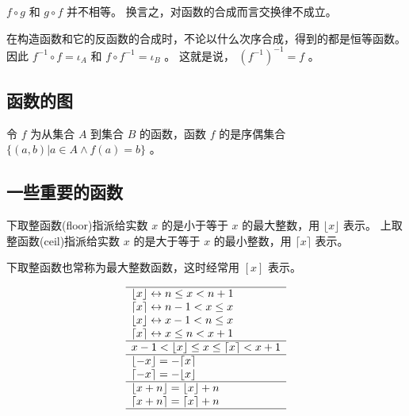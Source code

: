 {{        \begin{defines}
            $f \circ g$ 和 $g \circ f$ 并不相等。
            换言之，对函数的合成而言交换律不成立。
        \end{defines}

         在构造函数和它的反函数的合成时，不论以什么次序合成，得到的都是恒等函数。
         因此 $f^{-1} \circ f = \iota_A$ 和 $f \circ f^{-1} = \iota_B$ 。
         这就是说， $(f^{-1})^{-1} = f$ 。
    }

    \subsection{函数的图}
    {
        \begin{defines}
            令 $f$ 为从集合 $A$ 到集合 $B$ 的函数，函数 $f$ 的是序偶集合 $\{(a, b) | a \in A \wedge f(a) = b\}$ 。
        \end{defines}
    }

    \subsection{一些重要的函数}
    {
        \begin{defines}
            下取整函数(floor)指派给实数 $x$ 的是小于等于 $x$ 的最大整数，用 $\lfloor x \rfloor$ 表示。
            上取整函数(ceil)指派给实数 $x$ 的是大于等于 $x$ 的最小整数，用 $\lceil x \rceil$ 表示。
        \end{defines}

        \begin{defines}
            下取整函数也常称为最大整数函数，这时经常用 $[x]$ 表示。
        \end{defines}

        \begin{table}[htb]
            \[
                \begin{array}{l}
                    \hline
                    \lfloor x \rfloor \leftrightarrow n \leq x < n + 1 \\
                    \lceil x \rceil \leftrightarrow n - 1 < x \leq x \\
                    \lfloor x \rfloor \leftrightarrow x - 1 < n \leq x \\
                    \lceil x \rceil \leftrightarrow x \leq n < x + 1 \\
                    \hline
                    x - 1 < \lfloor x \rfloor \leq x \leq \lceil x \rceil < x + 1 \\
                    \hline
                    \lfloor -x \rfloor = - \lceil x \rceil \\
                    \lceil -x \rceil = - \lfloor x \rfloor \\
                    \hline
                    \lfloor x + n \rfloor = \lfloor x \rfloor + n \\
                    \lceil x + n \rceil = \lceil x \rceil + n \\
                    \hline
                \end{array}
            \]
        \end{table}

}}
